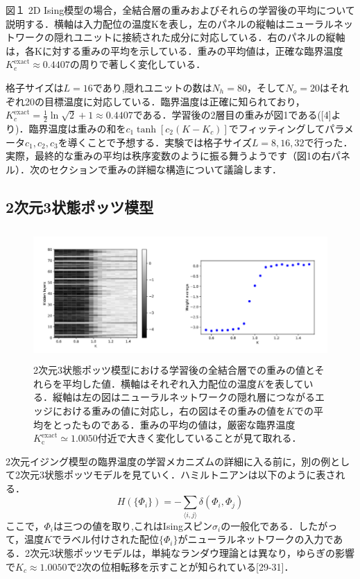 \documentclass[a4paper,11pt]{jsarticle}
\begin{document}
図１
2D Ising模型の場合，全結合層の重みおよびそれらの学習後の平均について説明する．横軸は入力配位の温度Kを表し，左のパネルの縦軸はニューラルネットワークの隠れユニットに接続された成分に対応している．右のパネルの縦軸は，各Kに対する重みの平均を示している．重みの平均値は，正確な臨界温度$K_e^{\text{exact}} \approx 0.4407$の周りで著しく変化している．


格子サイズは$L = 16$であり,隠れユニットの数は$N_h = 80$，そして$N_o = 20$はそれぞれ20の目標温度に対応している．臨界温度は正確に知られており，$K_c^{\text{exact}} = \frac{1}{2}\ln{\sqrt{2}+1} \approx 0.4407$である．学習後の2層目の重みが図1である([4]より)．臨界温度は重みの和を$c_1 \tanh{[c_2(K-K_c)]}$でフィッティングしてパラメータ$c_1,c_2,c_3$を導くことで予想する．実験では格子サイズ$L=8,16,32$で行った．実際，最終的な重みの平均は秩序変数のように振る舞うようです（図1の右パネル）．次のセクションで重みの詳細な構造について議論します．


\subsection{2次元3状態ポッツ模型}
\begin{figure}[hb]
  \begin{center}
    \includegraphics[height=5cm]{image/Figure2.png}
    \caption{2次元3状態ポッツ模型における学習後の全結合層での重みの値とそれらを平均した値．横軸はそれぞれ入力配位の温度$K$を表している．縦軸は左の図はニューラルネットワークの隠れ層につながるエッジにおける重みの値に対応し，右の図はその重みの値を$K$での平均をとったものである．重みの平均の値は，厳密な臨界温度$K_{\text{c}}^{\text{exact}}\simeq 1.0050$付近で大きく変化していることが見て取れる．}
  \end{center}
\end{figure}
2次元イジング模型の臨界温度の学習メカニズムの詳細に入る前に，別の例として2次元3状態ポッツモデルを見ていく．ハミルトニアンは以下のように表される．
\begin{equation}
  H(\{\Phi_i\}) = - \sum_{\langle i,j \rangle} \delta(\Phi_i, \Phi_j)
\end{equation}
ここで，$\Phi_i$は三つの値を取り,これはIsingスピン$\sigma_i$の一般化である．したがって，温度$K$でラベル付けされた配位$\{ \Phi_i \}$がニューラルネットワークの入力である．2次元3状態ポッツモデルは，単純なランダウ理論とは異なり，ゆらぎの影響で$K_c \approx 1.0050$で2次の位相転移を示すことが知られている[29-31]．
\end{document}
